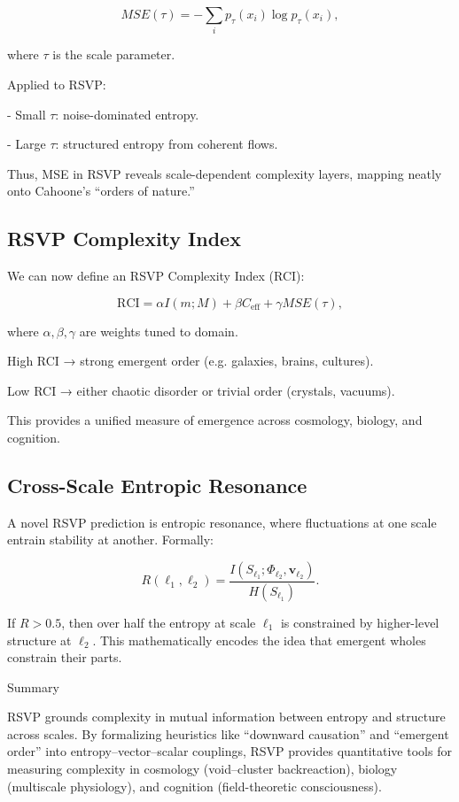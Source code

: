 \documentclass[12pt]{book}
\begin{document}
\[ MSE(\tau) = - \sum_i p_\tau(x_i) \log p_\tau(x_i), \]

where \( \tau \) is the scale parameter.

Applied to RSVP:

- Small \( \tau \): noise-dominated entropy.

- Large \( \tau \): structured entropy from coherent flows.

Thus, MSE in RSVP reveals scale-dependent complexity layers, mapping neatly onto Cahoone’s “orders of nature.”

\subsection{RSVP Complexity Index}
We can now define an RSVP Complexity Index (RCI):

\[ \text{RCI} = \alpha I(m;M) + \beta C_{\text{eff}} + \gamma MSE(\tau), \]

where \( \alpha, \beta, \gamma \) are weights tuned to domain.

High RCI → strong emergent order (e.g. galaxies, brains, cultures).

Low RCI → either chaotic disorder or trivial order (crystals, vacuums).

This provides a unified measure of emergence across cosmology, biology, and cognition.

\subsection{Cross-Scale Entropic Resonance}
A novel RSVP prediction is entropic resonance, where fluctuations at one scale entrain stability at another. Formally:

\[ R(\ell_1, \ell_2) = \frac{I(S_{\ell_1}; \Phi_{\ell_2}, \mathbf{v}_{\ell_2})}{H(S_{\ell_1})}. \]

If \( R > 0.5 \), then over half the entropy at scale \( \ell_1 \) is constrained by higher-level structure at \( \ell_2 \). This mathematically encodes the idea that emergent wholes constrain their parts.

Summary

RSVP grounds complexity in mutual information between entropy and structure across scales. By formalizing heuristics like “downward causation” and “emergent order” into entropy–vector–scalar couplings, RSVP provides quantitative tools for measuring complexity in cosmology (void–cluster backreaction), biology (multiscale physiology), and cognition (field-theoretic consciousness).
\end{document}
